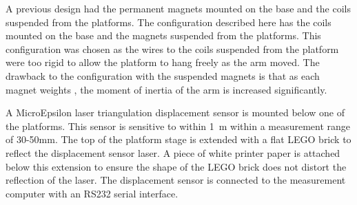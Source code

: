 \documentclass[aps,prstab,reprint,12pt]{revtex4-1}
\begin{document}
A previous design had the permanent magnets mounted on the base and the coils suspended from the platforms. The configuration described here has the coils mounted on the base and the magnets suspended from the platforms. This configuration was chosen as the wires to the coils suspended from the platform were too rigid to allow the platform to hang freely as the arm moved. The drawback to the configuration with the suspended magnets is that as each magnet weights %
, the moment of inertia of the arm is increased significantly.


A MicroEpsilon laser triangulation displacement sensor is mounted below one of the platforms. This sensor is sensitive to within 1\si{\mu m} within a measurement range of 30-50\si{mm}. The top of the platform stage is extended with a flat LEGO brick to reflect the displacement sensor laser. A piece of white printer paper is attached below this extension to ensure the shape of the LEGO brick does not distort the reflection of the laser. The displacement sensor is connected to the measurement computer with an RS232 serial interface.
\end{document}

